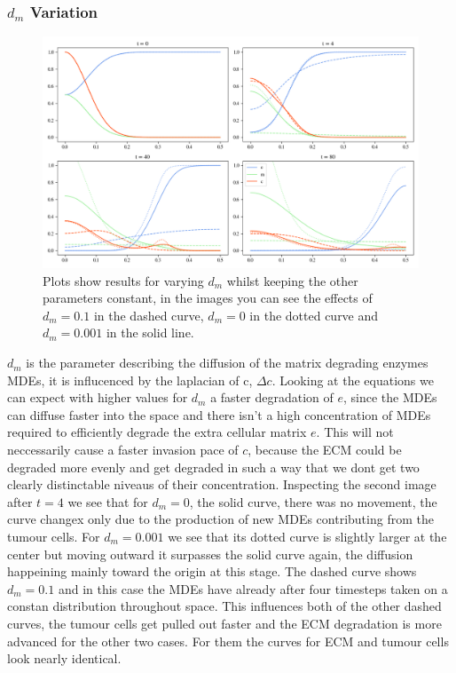 \subsubsection*{$d_m$ Variation}
\begin{figure}[h]
    \centering
    \includegraphics[width=\textwidth]{resources/images/dm_variation.png}
    \caption{Plots show results for varying $d_m$ whilst keeping the other parameters constant, in the images you can see the effects of $d_m=0.1$ in the dashed curve, $d_m=0$ in the dotted curve and $d_m=0.001$ in the solid line.}
    \label{fig:dm_variation}
\end{figure}
$d_m$ is the parameter describing the diffusion of the matrix degrading enzymes MDEs, it is influcenced by the laplacian of c, $\Delta c$. Looking at the equations we can expect with higher values for $d_m$ a faster degradation of $e$, since the MDEs can diffuse faster into the space and there isn't a high concentration of MDEs required to efficiently degrade the extra cellular matrix $e$. This will not neccessarily cause a faster invasion pace of $c$, because the ECM could be degraded more evenly and get degraded in such a way that we dont get two clearly distinctable niveaus of their concentration.
Inspecting the second image after $t=4$ we see that for $d_m=0$, the solid curve, there was no movement, the curve changex only due to the production of new MDEs contributing from the tumour cells. For $d_m=0.001$ we see that its dotted curve is slightly larger at the center but moving outward it surpasses the solid curve again, the diffusion happeining mainly toward the origin at this stage. The dashed curve shows $d_m=0.1$ and in this case the MDEs have already after four timesteps taken on a constan distribution throughout space. This influences both of the other dashed curves, the tumour cells get pulled out faster and the ECM degradation is more advanced for the other two cases. For them the curves for ECM and tumour cells look nearly identical.
